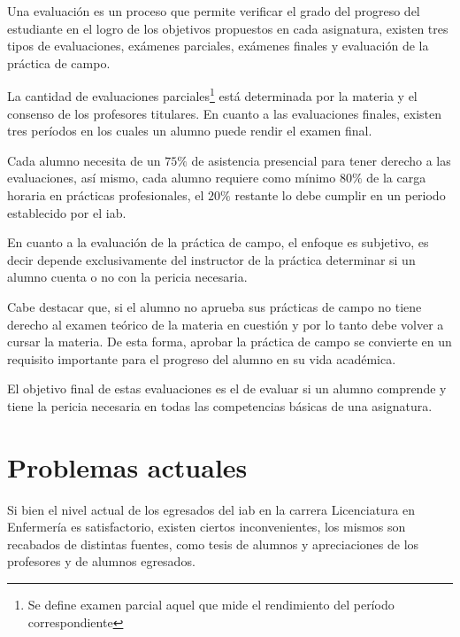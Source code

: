 Una evaluación es un proceso que permite verificar el grado del progreso del
estudiante en el logro de los objetivos propuestos en cada
asignatura\cite{iab:est_enfemeria}, existen tres tipos de evaluaciones, exámenes
parciales, exámenes finales y evaluación de la práctica de campo.

La cantidad de evaluaciones parciales\footnote{Se
    define examen parcial aquel que mide el rendimiento del período
    correspondiente\cite{iab:est_enfemeria}} está determinada por la materia y el
consenso de los profesores titulares\cite{iab:est_enfemeria}. En cuanto a las 
evaluaciones finales, existen tres períodos en los cuales un alumno puede rendir 
el examen final.


Cada alumno necesita de un $75\%$ de asistencia presencial para tener derecho a
las evaluaciones, así mismo, cada alumno requiere como mínimo $80\%$ de la carga
horaria en prácticas profesionales, el $20\%$ restante lo debe cumplir en un
periodo establecido por el \Gls{iab}.

En cuanto a la evaluación de la práctica de campo, el enfoque es
subjetivo, es decir depende exclusivamente del instructor de la práctica
determinar si un alumno cuenta o no con la pericia necesaria.
    
Cabe destacar que, si el alumno no aprueba sus prácticas de campo no tiene 
derecho al examen teórico de la materia en cuestión y por lo tanto debe volver 
a cursar la materia. De esta forma, aprobar la práctica de campo se convierte 
en un requisito importante para el progreso del alumno en su vida académica.

El objetivo final de estas evaluaciones es el de evaluar si un alumno comprende
y tiene la pericia necesaria en todas las competencias básicas de una
asignatura.



\section{Problemas actuales}
\label{sec:problemas_actuales}

Si bien el nivel actual de los egresados del \Gls{iab} en la carrera
Licenciatura en Enfermería es satisfactorio, existen ciertos inconvenientes, los
mismos son recabados de distintas fuentes, como tesis de
alumnos\cite{iab:tesis_atencion,iab:tesis_alumnos} y apreciaciones de los profesores y de alumnos egresados.

